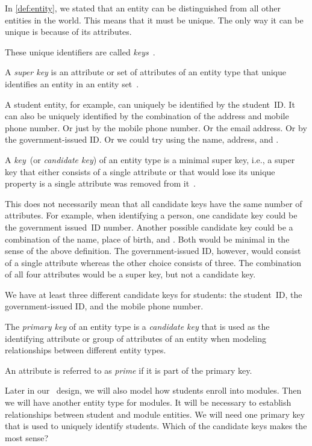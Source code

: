 %
\label{sec:conceptualKeys}%
%
In \cref{def:entity}, we stated that an entity can be distinguished from all other entities in the world.
This means that it must be unique.
The only way it can be unique is because of its attributes.

These unique identifiers are called \emph{keys}~\cite{S2024D:CDMERDE}.%
%
\begin{definition}%
\label{def:superKey}%
A \emph{super key} is an attribute or set of attributes of an entity type that unique identifies an entity in an entity set~\cite{S2024D:CDMERDE,G2011EW2ITDS:CMUTERM}.%
\end{definition}%
%
A student entity, for example, can uniquely be identified by the student~ID.
It can also be uniquely identified by the combination of the address and mobile phone number.
Or just by the mobile phone number.
Or the email address.
Or by the government-issued ID.
Or we could try using the name, address, and .%
%
\begin{definition}%
\label{def:key}%
A \emph{key}~(or \emph{candidate key}) of an entity type is a minimal super key, i.e., a super key that either consists of a single attribute or that would lose its unique property is a single attribute was removed from it~\cite{S2024D:CDMERDE,G2011EW2ITDS:CMUTERM,SS2005EIDDDFDB:SDLDUTRDM}.%
\end{definition}%
%
This does not necessarily mean that all candidate keys have the same number of attributes.
For example, when identifying a person, one candidate key could be the government issued~ID number.
Another possible candidate key could be a combination of the name, place of birth, and .
Both would be minimal in the sense of the above definition.
The government-issued ID, however, would consist of a single attribute whereas the other choice consists of three.
The combination of all four attributes would be a super key, but not a candidate key.

We have at least three different candidate keys for students:
the student~ID, the government-issued ID, and the mobile phone number.%
%
\begin{definition}%
\label{def:primaryKey}%
The \emph{primary key} of an entity type is a \emph{candidate key} that is used as the identifying attribute or group of attributes of an entity when modeling relationships between different entity types.%
\end{definition}%
%
\begin{definition}%
An attribute is referred to as \emph{prime} if it is part of the primary key.%
\end{definition}%
%
Later in our \db\ design, we will also model how students enroll into modules.
Then we will have another entity type for modules.
It will be necessary to establish relationships between student and module entities.
We will need one primary key that is used to uniquely identify students.
Which of the candidate keys makes the most sense?

